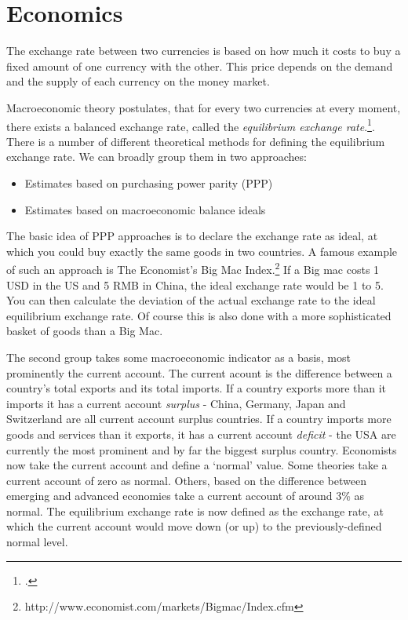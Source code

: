 \section{Economics}

The exchange rate between two currencies is based on how much it 
costs to buy a fixed amount of one currency with the other. This price 
depends on the demand and the supply of each currency on the money market. 

Macroeconomic theory postulates, that for every two currencies at every 
moment, there exists a balanced exchange rate, called the 
\emph{equilibrium exchange rate}.\footnote{\cite[pp. 505]{Krugman2008}.}. There is a number of different theoretical methods for defining the equilibrium exchange rate. We can broadly group them in two approaches: 

\begin{itemize}
\item{Estimates based on purchasing power parity (PPP)}
\item{Estimates based on macroeconomic balance ideals}
\end{itemize}

The basic idea of PPP approaches is to declare the exchange rate as ideal, at which you could buy exactly the same goods in two countries. A famous example of such an approach is The Economist's Big Mac Index.\footnote{http://www.economist.com/markets/Bigmac/Index.cfm} If a Big mac costs 1 USD in the US and 5 RMB in China, the ideal exchange rate would be 1 to 5. You can then calculate the deviation of the actual exchange rate to the ideal equilibrium exchange rate. Of course this is also done with a more sophisticated basket of goods than a Big Mac. 

The second group takes some macroeconomic indicator as a basis, most prominently the current account. The current acount is the difference between a country's total exports and its total imports. If a country exports more than it imports it has a current account \emph{surplus} - China, Germany, Japan and Switzerland are all current account surplus countries. If a country imports more goods and services than it exports, it has a current account \emph{deficit} - the USA are currently the most prominent and by far the biggest surplus country. Economists now take the current account and define a `normal' value. Some theories take a current account of zero as normal. Others, based on the difference between emerging and advanced economies take a current account of around 3\% as normal. The equilibrium exchange rate is now defined as the exchange rate, at which the current account would move down (or up) to the previously-defined normal level.

